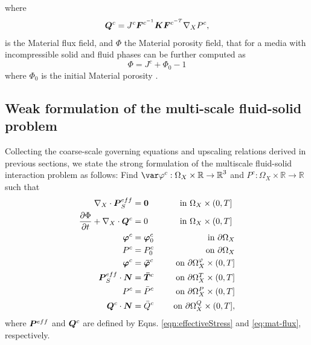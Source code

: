 \documentclass[preprint,3p,12pt,number,sort&compress]{elsarticle}
\def\vec   #1{\text{\boldmath $#1$}{}}
\def\ten   #1{\text{\boldmath $#1$}{}}
\def\R{\mbox{\(\mathbb{R}\)}}
\begin{document}
where 
\begin{equation}
 \vec{Q}^c=    J^c \ten F^{c^{-1}} \ten K \ten F^{c^{-T}} \nabla_X P^c, \label{eq:mat-flux}   
\end{equation}
is the Material flux field, and $\Phi$ the Material porosity field, that for a media with incompressible solid and fluid phases can be further computed as
\begin{equation}
    \Phi=J^c+\Phi_0-1
\end{equation}
where  $\Phi_0$ is the initial Material porosity \cite{coussy2004poromechanics,macminn2016large}.

\subsection{Weak formulation of the multi-scale fluid-solid problem}
Collecting the coarse-scale governing equations and upscaling relations derived in previous sections, we state the strong formulation of the multiscale fluid-solid interaction problem as follows: Find $\var \varphi^c:\Omega_X \times \R \to \R^3$ and $P^c:\Omega_X \times \R \to \R$ such that
\begin{eqnarray}
	 \nabla_X \cdot  	\ten P_S^{eff} &=\vec 0 &\quad \mbox{ in $\Omega_X \times (0,T]$ }  \label{eqn:LinearMomentumConservationFinal} \\
	 \dfrac{\partial \Phi}{\partial t} +\nabla_X \cdot \vec{Q}^c &=0 &\quad \mbox{ in $\Omega_X \times (0,T]$ }  \label{eqn:MassConservationFinal}   \\
	 \vec \varphi^c &= {\vec{ \varphi}_0^c} &\quad \mbox{ in $\partial \Omega_X$}  \\
	 P^c &=  P_0^c &\quad \mbox{ on $\partial \Omega_X$} \\
	 \vec \varphi^c &= {\vec{\bar \varphi}^c} &\quad \mbox{ on $\partial \Omega_X^{\varphi}$} \times (0,T] \\
	\ten P_S^{eff}  \cdot \vec N &= \vec{\bar T}^{c} &\quad \mbox{ on $\partial \Omega_X^T$} \times (0,T] \label{eqn:bc_traction}\\
	 P^c &= \bar P^c &\quad \mbox{ on $\partial \Omega_X^P$}\times (0,T] \\
	 \vec{Q}^c \cdot \vec N &= {\bar Q}^c &\quad \mbox{ on $\partial \Omega_X^Q$} \times (0,T] \label{eqn:bc_flux},
\end{eqnarray}
where $\ten P^{eff}$ and $\ten Q^c$ are defined by Eqns. \eqref{eqn:effectiveStress} and \eqref{eq:mat-flux}, respectively.\\
\end{document}
